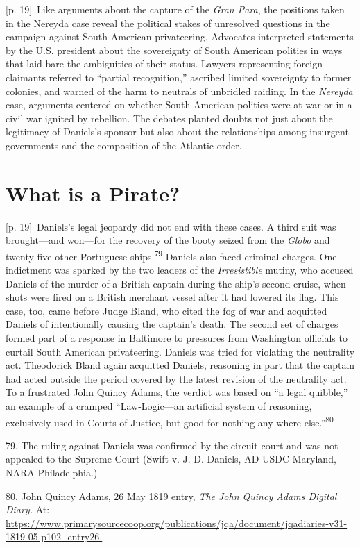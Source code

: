 \documentclass[10pt,a4paper]{article}
\begin{document}
{\scriptsize\color{gray} [p. 19]}\ Like arguments about the capture of the \textit{Gran Para}, the positions taken in the Nereyda case reveal the political stakes of unresolved questions in the campaign against South American privateering. Advocates interpreted statements by the U.S. president about the sovereignty of South American polities in ways that laid bare the ambiguities of their status. Lawyers representing foreign claimants referred to “partial recognition,” ascribed limited sovereignty to former colonies, and warned of the harm to neutrals of unbridled raiding. In the \textit{Nereyda} case, arguments centered on whether South American polities were at war or in a civil war ignited by rebellion. The debates planted doubts not just about the legitimacy of Daniels’s sponsor but also about the relationships among insurgent governments and the composition of the Atlantic order.\par
{}\section*{What is a Pirate?}
{\scriptsize\color{gray} [p. 19]}\ Daniels’s legal jeopardy did not end with these cases. A third suit was brought—and won—for the recovery of the booty seized from the \textit{Globo} and twenty-five other Portuguese ships.\nobreak\textsuperscript{79} Daniels also faced criminal charges. One indictment was sparked by the two leaders of the \textit{Irresistible} mutiny, who accused Daniels of the murder of a British captain during the ship’s second cruise, when shots were fired on a British merchant vessel after it had lowered its flag. This case, too, came before Judge Bland, who cited the fog of war and acquitted Daniels of intentionally causing the captain’s death. The second set of charges formed part of a response in Baltimore to pressures from Washington officials to curtail South American privateering. Daniels was tried for violating the neutrality act. Theodorick Bland again acquitted Daniels, reasoning in part that the captain had acted outside the period covered by the latest revision of the neutrality act. To a frustrated John Quincy Adams, the verdict was based on “a legal quibble,” an example of a cramped “Law-Logic—an artificial system of reasoning, exclusively used in Courts of Justice, but good for nothing any where else.”\nobreak\textsuperscript{80}\par{\small 79. The ruling against Daniels was confirmed by the circuit court and was not appealed to the Supreme Court (Swift v. J. D. Daniels, AD USDC Maryland, NARA Philadelphia.)\par}{\small 80. John Quincy Adams, 26 May 1819 entry, \textit{The John Quincy Adams Digital Diary.} At: \url{https://www.primarysourcecoop.org/publications/jqa/document/jqadiaries-v31-1819-05-p102--entry26.}\par}
\end{document}
